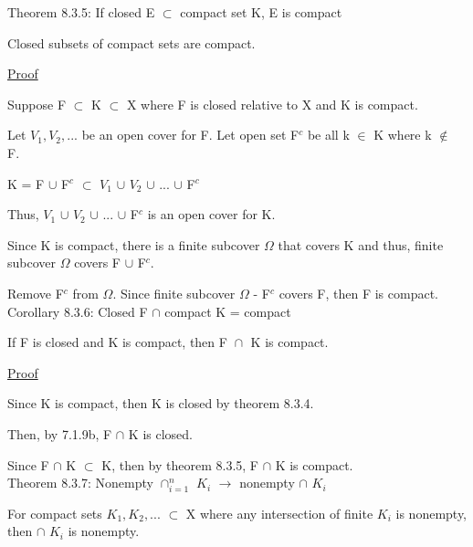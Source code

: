 { \color{red} Theorem 8.3.5: If closed E $\subset$ compact set K, E is compact } 

	\begin{adjustbox}{minipage=14cm, right, vspace=0.1cm 0cm}
		Closed subsets of compact sets are compact.
	\end{adjustbox}

{ \color{magenta} \underline{Proof} } 

	Suppose F $\subset$ K $\subset$ X where F is closed relative to X
	and K is compact.

	Let $V_1, V_2, ...$ be an open cover for F.
	Let open set F$^c$ be all k $\in$ K where k $\not \in$ F.

	\qquad K = F $\cup$ F$^c$ $\subset$ $V_1$ $\cup$ $V_2$ $\cup$ ... $\cup$ F$^c$

	Thus, $V_1$ $\cup$ $V_2$ $\cup$ ... $\cup$ F$^c$ is an open cover for K.

	Since K is compact, there is a finite subcover $\Omega$ that covers K
	and thus, finite subcover $\Omega$ covers F $\cup$ F$^c$.
	
	Remove F$^c$ from $\Omega$. Since finite subcover $\Omega$ - F$^c$ covers F,
	then F is compact. \\

{ \color{orange} Corollary 8.3.6: Closed F $\cap$ compact K = compact } 

	\begin{adjustbox}{minipage=14cm, right, vspace=0.1cm 0cm}
		If F is closed and K is compact, then F $\cap_{}^{}$ K is compact.
	\end{adjustbox}

{ \color{magenta} \underline{Proof} } 

	Since K is compact, then K is closed by {\color{red} theorem 8.3.4}.

	Then, by {\color{red} 7.1.9b}, F $\cap$ K is closed.

	Since F $\cap$ K $\subset$ K, then by {\color{red} theorem 8.3.5},
	F $\cap$ K is compact. \\

{ \color{red} Theorem 8.3.7: Nonempty $\cap_{i=1}^n$ $K_i$ $\rightarrow$
nonempty $\cap$ $K_i$ } 

	\begin{adjustbox}{minipage=14cm, right, vspace=0.1cm 0cm}
		For compact sets $K_1, K_2, ...$ $\subset$ X where any intersection
		of finite $K_i$ is nonempty, then $\cap$ $K_i$ is nonempty.
	\end{adjustbox}

